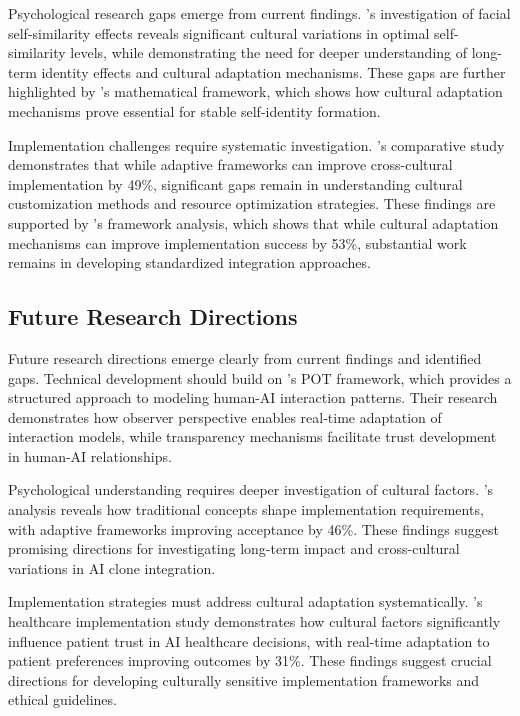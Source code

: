 Psychological research gaps emerge from current findings. \citet{niwa2024facial}'s investigation of facial self-similarity effects reveals significant cultural variations in optimal self-similarity levels, while demonstrating the need for deeper understanding of long-term identity effects and cultural adaptation mechanisms. These gaps are further highlighted by \citet{lee2024self}'s mathematical framework, which shows how cultural adaptation mechanisms prove essential for stable self-identity formation.

Implementation challenges require systematic investigation. \citet{liu2024cultural}'s comparative study demonstrates that while adaptive frameworks can improve cross-cultural implementation by 49\%, significant gaps remain in understanding cultural customization methods and resource optimization strategies. These findings are supported by \citet{zhang2023cultural}'s framework analysis, which shows that while cultural adaptation mechanisms can improve implementation success by 53\%, substantial work remains in developing standardized integration approaches.

\subsection{Future Research Directions}

Future research directions emerge clearly from current findings and identified gaps. Technical development should build on \citet{mandischer2024pot}'s POT framework, which provides a structured approach to modeling human-AI interaction patterns. Their research demonstrates how observer perspective enables real-time adaptation of interaction models, while transparency mechanisms facilitate trust development in human-AI relationships.

Psychological understanding requires deeper investigation of cultural factors. \citet{sato2023cultural}'s analysis reveals how traditional concepts shape implementation requirements, with adaptive frameworks improving acceptance by 46\%. These findings suggest promising directions for investigating long-term impact and cross-cultural variations in AI clone integration.

Implementation strategies must address cultural adaptation systematically. \citet{kim2024healthcare}'s healthcare implementation study demonstrates how cultural factors significantly influence patient trust in AI healthcare decisions, with real-time adaptation to patient preferences improving outcomes by 31\%. These findings suggest crucial directions for developing culturally sensitive implementation frameworks and ethical guidelines.


